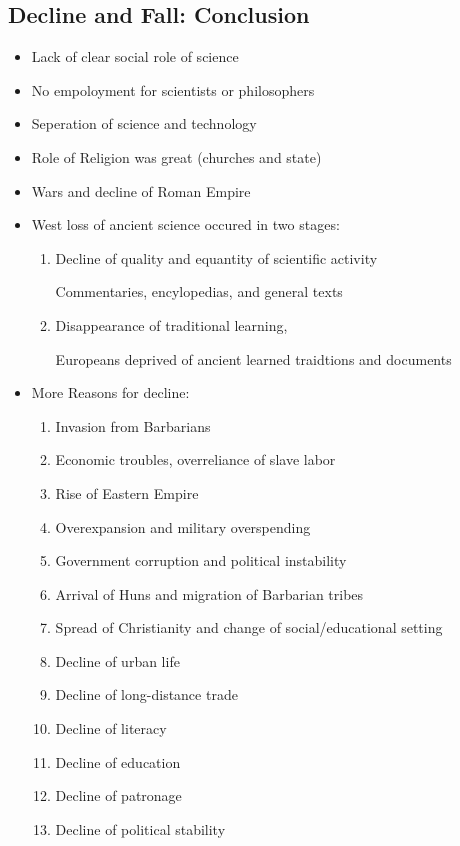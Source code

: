 \documentclass{article}
\begin{document}
\subsection{Decline and Fall: Conclusion}
\begin{itemize}
  \item Lack of clear social role of science
  \item No empoloyment for scientists or philosophers
  \item Seperation of science and technology
  \item Role of Religion was great (churches and state)
  \item Wars and decline of Roman Empire
  \item West loss of ancient science occured in two stages:
    \begin{enumerate}
      \item Decline of quality and equantity of scientific activity

        Commentaries, encylopedias, and general texts
      \item Disappearance of traditional learning,

        Europeans deprived of ancient learned traidtions and documents
    \end{enumerate}
  \item More Reasons for decline:
    \begin{enumerate}
      \item Invasion from Barbarians
      \item Economic troubles, overreliance of slave labor
      \item Rise of Eastern Empire
      \item Overexpansion and military overspending
      \item Government corruption and political instability
      \item Arrival of Huns and migration of Barbarian tribes
      \item Spread of Christianity and change of social/educational setting
      \item Decline of urban life
      \item Decline of long-distance trade
      \item Decline of literacy
      \item Decline of education
      \item Decline of patronage
      \item Decline of political stability
    \end{enumerate}
\end{itemize}
\end{document}
